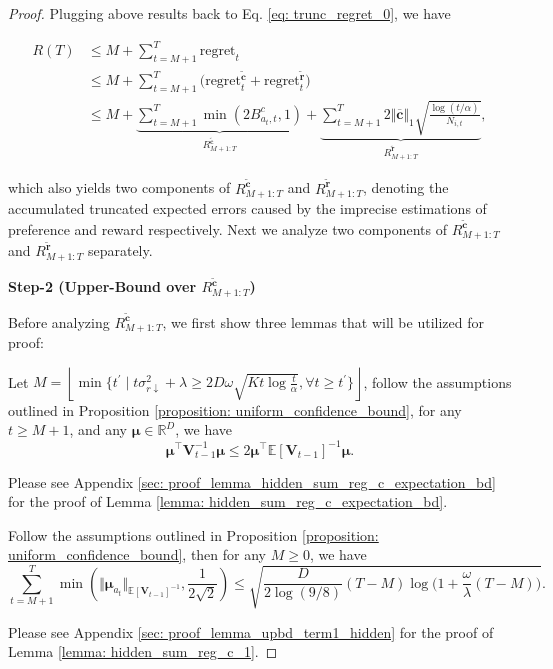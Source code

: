 \begin{proof}
Plugging above results back to Eq. \ref{eq: trunc_regret_0}, we have 

\begin{equation}
\begin{aligned}
\label{eq: trunc_regret}
R(T) 
& \leq
M
+
\sum_{t=M+1}^{T} \text{regret}_t \\
& \leq
M 
+
\sum_{t=M+1}^{T} \Big( \text{regret}_{t}^{\tilde{\boldsymbol{c}}} 
+
\text{regret}_{t}^{\tilde{\boldsymbol{r}}}
\Big)
\\ 
& \leq
M
+
\underbrace{
\sum_{t=M+1}^{T} 
\min \left( 2 B_{a_t,t}^{c}, 1 \right)
}_{R_{M+1:T}^{\tilde{\boldsymbol{c}}}}+
\underbrace{
\sum_{t=M+1}^{T} 2 \Vert\boldsymbol{\overline{c}}\Vert_1 \sqrt{\frac{ \log(t/\alpha)}{N_{i,t}}} 
}_{R_{M+1:T}^{\tilde{\boldsymbol{r}}}},
\end{aligned}
\end{equation}

which also yields two components of $R_{M+1:T}^{\tilde{\boldsymbol{c}}}$ and $R_{M+1:T}^{\tilde{\boldsymbol{r}}}$, denoting the accumulated truncated expected errors caused by the imprecise estimations of preference and reward respectively. 
Next we analyze two components of $R_{M+1:T}^{\tilde{\boldsymbol{c}}}$ and $R_{M+1:T}^{\tilde{\boldsymbol{r}}}$ separately.


\textbf{Step-2 (Upper-Bound over $R_{M+1:T}^{\tilde{\boldsymbol{c}}}$)}

Before analyzing $R_{M+1:T}^{\tilde{\boldsymbol{c}}}$, we first show three lemmas that will be utilized for proof:

\begin{lemma}
\label{lemma: hidden_sum_reg_c_expectation_bd}
Let $M = \left\lfloor \min \big \{ t^{\prime} \mid t  \sigma^2_{r \downarrow} + \lambda \geq 2D \omega \sqrt{Kt\log \frac{t}{\alpha} }, \forall t \geq t^{\prime} \big \} \right \rfloor$, follow the assumptions outlined in Proposition \ref{proposition: uniform_confidence_bound}, for any $t \geq M+1$, and any $\boldsymbol{\mu} \in \mathbb{R}^{D}$, we have 
\[
\boldsymbol{\mu}^{\top} \boldsymbol{V}_{t-1}^{-1} \boldsymbol{\mu}
\leq
2 \boldsymbol{\mu}^{\top} \mathbb{E}[\boldsymbol{V}_{t-1}]^{-1} \boldsymbol{\mu}.
\]
\end{lemma}
Please see Appendix \ref{sec: proof_lemma_hidden_sum_reg_c_expectation_bd} for the proof of Lemma \ref{lemma: hidden_sum_reg_c_expectation_bd}.



\begin{lemma}
\label{lemma: hidden_sum_reg_c_1}
Follow the assumptions outlined in Proposition \ref{proposition: uniform_confidence_bound}, then for any $M \geq 0$, we have
\[
\sum_{t=M+1}^{T}
\min \left(
\Vert \boldsymbol{\mu}_{a_t} \Vert_{\mathbb{E}\left[\boldsymbol{V}_{t-1}\right]^{-1}}, 
\frac{1}{2\sqrt{2}}
\right)
\leq
\sqrt{\frac{D}{2 \log(9/8)} (T-M) \log \Big( 1 + \frac{\omega}{\lambda}(T-M) \Big) }.
\]
\end{lemma}
Please see Appendix \ref{sec: proof_lemma_upbd_term1_hidden} for the proof of Lemma \ref{lemma: hidden_sum_reg_c_1}.


\end{proof}

